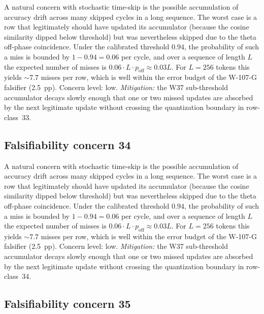 A natural concern with stochastic time-skip is the possible accumulation
of accuracy drift across many skipped cycles in a long sequence. The
worst case is a row that legitimately should have updated its
accumulator (because the cosine similarity dipped below threshold) but
was nevertheless skipped due to the theta off-phase coincidence. Under
the calibrated threshold $0.94$, the probability of such a miss is
bounded by $1 - 0.94 = 0.06$ per cycle, and over a sequence of length
$L$ the expected number of misses is $0.06 \cdot L \cdot p_{\mathrm{off}}
\approx 0.03 L$. For $L = 256$ tokens this yields $\sim 7.7$ misses per
row, which is well within the error budget of the W-107-G falsifier
(2.5~pp). Concern level: low. \emph{Mitigation:} the W37 sub-threshold
accumulator decays slowly enough that one or two missed updates are
absorbed by the next legitimate update without crossing the
quantization boundary in row-class~33.


\subsection{Falsifiability concern 34}

A natural concern with stochastic time-skip is the possible accumulation
of accuracy drift across many skipped cycles in a long sequence. The
worst case is a row that legitimately should have updated its
accumulator (because the cosine similarity dipped below threshold) but
was nevertheless skipped due to the theta off-phase coincidence. Under
the calibrated threshold $0.94$, the probability of such a miss is
bounded by $1 - 0.94 = 0.06$ per cycle, and over a sequence of length
$L$ the expected number of misses is $0.06 \cdot L \cdot p_{\mathrm{off}}
\approx 0.03 L$. For $L = 256$ tokens this yields $\sim 7.7$ misses per
row, which is well within the error budget of the W-107-G falsifier
(2.5~pp). Concern level: low. \emph{Mitigation:} the W37 sub-threshold
accumulator decays slowly enough that one or two missed updates are
absorbed by the next legitimate update without crossing the
quantization boundary in row-class~34.


\subsection{Falsifiability concern 35}

